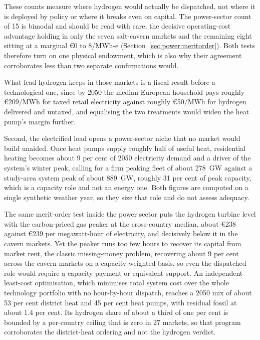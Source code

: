 These counts measure where hydrogen would actually be dispatched, not where it is
deployed by policy or where it breaks even on capital. The power-sector count of 15 is
bimodal and should be read with care, the decisive operating-cost advantage holding in
only the seven salt-cavern markets and the remaining eight sitting at a marginal
\euro{}0 to 8/MWh-e (Section~\ref{sec:power:meritorder}). Both tests therefore turn on
one physical endowment, which is also why their agreement corroborates less than two
separate confirmations would.

What lead hydrogen keeps in those markets is a fiscal result before a
technological one, since by 2050 the median European household pays roughly
\euro{}209/MWh for taxed retail electricity against roughly \euro{}50/MWh for hydrogen
delivered and untaxed, and equalising the two treatments would widen the heat pump's
margin further.

Second, the electrified load opens a power-sector niche that no market would build
unaided. Once heat pumps supply roughly half of useful heat, residential heating
becomes about 9 per cent of 2050 electricity demand and a driver of the system's
winter peak, calling for a firm peaking fleet of about 278~GW against a study-area
system peak of about 889~GW, roughly 31 per cent of peak capacity, which is a capacity
role and not an energy one. Both figures are computed on a single synthetic weather
year, so they size that role and do not assess adequacy.

The same merit-order test inside the power sector puts the hydrogen turbine level with
the carbon-priced gas peaker at the cross-country median,
about \euro{}238 against \euro{}239 per megawatt-hour of electricity, and decisively
below it in the cavern markets. Yet the peaker runs too few hours to recover its
capital from market rent, the classic missing-money problem, recovering about 9 per
cent across the cavern markets on a capacity-weighted basis, so even the dispatched
role would require a capacity payment or equivalent support. An independent least-cost
optimisation, which minimises total system cost over the whole technology portfolio
with no hour-by-hour dispatch, reaches a 2050 mix of about 53 per cent district heat
and 45 per cent heat pumps, with residual fossil at about 1.4 per cent. Its hydrogen
share of about a third of one per cent is bounded by a per-country ceiling that is zero
in 27 markets, so that program corroborates the district-heat ordering and not the
hydrogen verdict.


